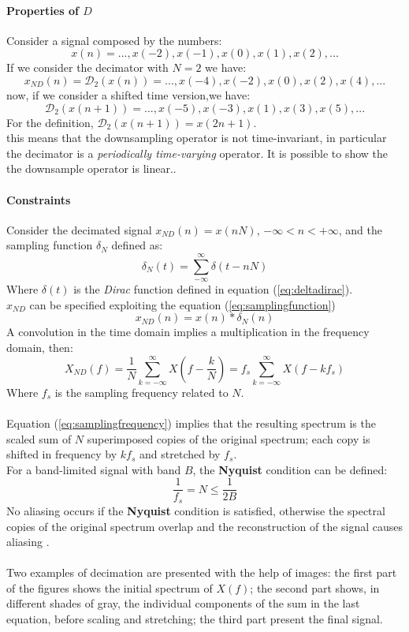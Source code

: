 \paragraph{Properties of $D$}
Consider a signal composed by the numbers:
\[ x(n) = ..., x(-2), x(-1), x(0), x(1), x(2), ... \]
If we consider the decimator with $N=2$ we have:
\[ x_{ND}(n) = \mathcal{D}_2(x(n)) = ..., x(-4), x(-2), x(0), x(2), x(4), ... \]
now, if we consider a shifted time version,we have:
\[ \mathcal{D}_2(x(n+1)) = ..., x(-5), x(-3), x(1), x(3), x(5), ... \]
For the definition,  $\mathcal{D}_2(x(n+1)) = x(2n+1)$.\\
this means that the downsampling operator is not time-invariant, in particular the decimator is a \textit{periodically time-varying} operator. It is possible to show the the downsample operator is linear.\cite{signalcommunications}.

\paragraph{Constraints} Consider the decimated signal $ x_{ND}(n) = x(nN)$, $-\infty < n < +\infty$, and the sampling function $\delta_N$ defined as:
\begin{equation}
\delta_N(t) = \sum_{-\infty}^{\infty} \delta (t-nN)
\label{eq:samplingfunction}
\end{equation}
Where $\delta (t)$ is the \textit{Dirac} function defined in equation (\ref{eq:deltadirac}).\\
$x_{ND}$ can be specified exploiting the equation (\ref{eq:samplingfunction})
\begin{equation}
x_{ND}(n) = x(n)*\delta_N(n)
\end{equation}
A convolution in the time domain implies a multiplication in the frequency domain, then:
\begin{equation}
X_{ND}(f) = \frac{1}{N} \sum_{k=-\infty}^{\infty} X(f-\frac{k}{N}) = f_s \sum_{k=-\infty}^{\infty} X(f-k f_s)
\label{eq:samplingfrequency}	
\end{equation}
Where $f_s$ is the sampling frequency related to $N$.\\\\
Equation (\ref{eq:samplingfrequency}) implies that the resulting spectrum is the scaled sum of $N$ superimposed copies of the original spectrum; each copy is shifted in frequency by $k f_s$ and stretched by $f_s$.\\  
For a band-limited signal with band $B$, the \textbf{Nyquist} condition can be defined:
\begin{equation}
\frac{1}{f_s} = N \leq \frac{1}{2B}
\end{equation}
No aliasing occurs if the \textbf{Nyquist} condition is satisfied, otherwise the spectral copies of the original spectrum overlap and the reconstruction of the signal causes aliasing \cite{signalcommunications}.\\\\
Two examples of decimation are presented with the help of images: the first part of the figures shows the initial spectrum of $X(f)$; the second part shows, in different shades of gray,  the individual components of the sum in the last equation, before scaling and stretching; the third part present the final signal.\\
